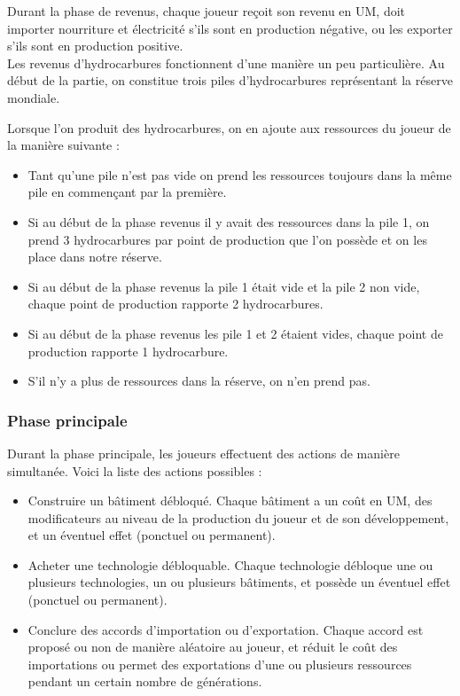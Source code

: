 \documentclass[12pt,twoside,a4paper]{article}
\begin{document}
Durant la phase de revenus, chaque joueur re\c coit son revenu en UM, doit importer nourriture et \'electricit\'e s'ils sont en production n\'egative, ou les exporter s'ils sont en production positive.\\
Les revenus d'hydrocarbures fonctionnent d'une mani\`ere un peu particuli\`ere. Au d\'ebut de la partie, on constitue trois piles d'hydrocarbures repr\'esentant la r\'eserve mondiale. 

Lorsque l'on produit des hydrocarbures, on en ajoute aux ressources du joueur de la mani\`ere suivante :

\begin{itemize}
\item Tant qu'une pile n'est pas vide on prend les ressources toujours dans la m\^eme pile en commen\c cant par la premi\`ere.
\item Si au d\'ebut de la phase revenus il y avait des ressources dans la pile 1, on prend 3 hydrocarbures par point de production que l'on poss\`ede et on les place dans notre r\'eserve.
\item Si au d\'ebut de la phase revenus la pile 1 \'etait vide et la pile 2 non vide, chaque point de production rapporte 2 hydrocarbures.
\item Si au d\'ebut de la phase revenus les pile 1 et 2 \'etaient vides, chaque point de production rapporte 1 hydrocarbure.
\item S'il n'y a plus de ressources dans la r\'eserve, on n'en prend pas.
\end{itemize}


\subsubsection{Phase principale}

Durant la phase principale, les joueurs effectuent des actions de mani\`ere simultan\'ee. Voici la liste des actions possibles :

\begin{itemize}
\item Construire un b\^atiment d\'ebloqu\'e. Chaque b\^atiment a un co\^ut en UM, des modificateurs au niveau de la production du joueur et de son d\'eveloppement, et un \'eventuel effet (ponctuel ou permanent).
\item Acheter une technologie d\'ebloquable. Chaque technologie d\'ebloque une ou plusieurs technologies, un ou plusieurs b\^atiments, et poss\`ede un \'eventuel effet (ponctuel ou permanent).
\item Conclure des accords d'importation ou d'exportation. Chaque accord est propos\'e ou non de mani\`ere al\'eatoire au joueur, et r\'eduit le co\^ut des importations ou permet des exportations d'une ou plusieurs ressources pendant un certain nombre de g\'en\'erations.
\end{itemize}
\end{document}
